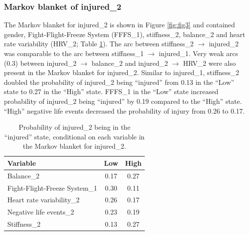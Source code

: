\documentclass[
  english,
  man]{apa6}
\begin{document}
\hypertarget{markov-blanket-of-injured_2}{%
\subsubsection{Markov blanket of injured\_2}\label{markov-blanket-of-injured_2}}

The Markov blanket for injured\_2 is shown in Figure \ref{fig:fig3} and contained gender, Fight-Flight-Freeze System (FFFS\_1), stiffness\_2, balance\_2 and heart rate variability (HRV\_2; Table \ref{tab:table6}).
The arc between stiffness\_2 \(\rightarrow\) injured\_2 was comparable to the arc between stiffness\_1 \(\rightarrow\) injured\_1.
Very weak arcs (0.3) between injured\_2 \(\rightarrow\) balance\_2 and injured\_2 \(\rightarrow\) HRV\_2 were also present in the Markov blanket for injured\_2.
Similar to injured\_1, stiffness\_2 doubled the probability of injured\_2 being ``injured'' from 0.13 in the ``Low'' state to 0.27 in the ``High'' state.
FFFS\_1 in the ``Low'' state increased probability of injured\_2 being ``injured'' by 0.19 compared to the ``High'' state.
``High'' negative life events decreased the probability of injury from 0.26 to 0.17.

\begin{table}[H]

\caption{\label{tab:table6}Probability of injured\_2 being in the ``injured'' state, conditional on each variable in the Markov blanket for injured\_2.}
\centering
\begin{tabular}[t]{l|c|c}
\hline
\textbf{Variable} & \textbf{Low} & \textbf{High}\\
\hline
Balance\_2 & 0.17 & 0.27\\
\hline
Fight-Flight-Freeze System\_1 & 0.30 & 0.11\\
\hline
Heart rate variability\_2 & 0.26 & 0.17\\
\hline
Negative life events\_2 & 0.23 & 0.19\\
\hline
Stiffness\_2 & 0.13 & 0.27\\
\hline
\end{tabular}
\end{table}
\end{document}
